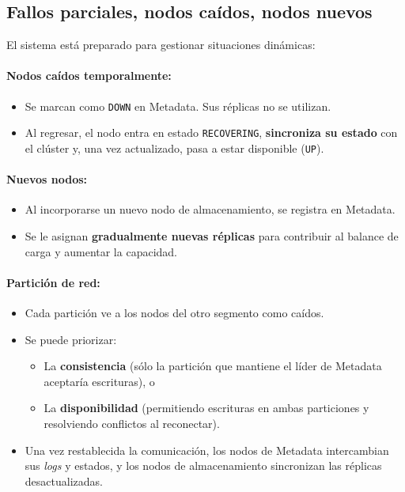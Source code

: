 \documentclass{article}
\begin{document}
\subsection{Fallos parciales, nodos caídos, nodos nuevos}
El sistema está preparado para gestionar situaciones dinámicas:

\paragraph{Nodos caídos temporalmente:}
\begin{itemize}
    \item Se marcan como \texttt{DOWN} en Metadata. Sus réplicas no se utilizan.
    \item Al regresar, el nodo entra en estado \texttt{RECOVERING}, \textbf{sincroniza su estado} con el clúster y, una vez actualizado, pasa a estar disponible (\texttt{UP}).
\end{itemize}

\paragraph{Nuevos nodos:}
\begin{itemize}
    \item Al incorporarse un nuevo nodo de almacenamiento, se registra en Metadata.
    \item Se le asignan \textbf{gradualmente nuevas réplicas} para contribuir al balance de carga y aumentar la capacidad.
\end{itemize}

\paragraph{Partición de red:}
\begin{itemize}
    \item Cada partición ve a los nodos del otro segmento como caídos.
    \item Se puede priorizar:
    \begin{itemize}
        \item La \textbf{consistencia} (sólo la partición que mantiene el líder de Metadata aceptaría escrituras), o
        \item La \textbf{disponibilidad} (permitiendo escrituras en ambas particiones y resolviendo conflictos al reconectar).
    \end{itemize}
    \item Una vez restablecida la comunicación, los nodos de Metadata intercambian sus \emph{logs} y estados, y los nodos de almacenamiento sincronizan las réplicas desactualizadas.
\end{itemize}
\end{document}
